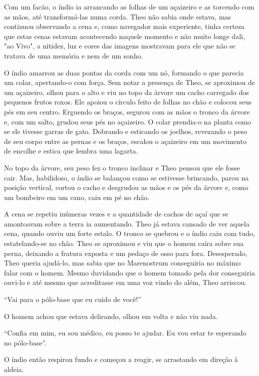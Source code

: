 Com um facão, o índio ia arrancando as folhas de um açaizeiro e as
torcendo com as mãos, até transformá-las numa corda. Theo não sabia onde
estava, mas continuou observando a cena e, como navegador mais
experiente, tinha certeza que estas cenas estavam acontecendo naquele
momento e não muito longe dali, "ao Vivo", a nitidez, luz e cores das
imagens mostravam para ele que não se tratava de uma memória e nem de um
sonho.

O índio amarrou as duas pontas da corda com um nó, formando o que
parecia um colar, apertando-o com força. Sem notar a presença de Theo,
se aproximou de um açaizeiro, olhou para o alto e viu no topo da árvore
um cacho carregado dos pequenos frutos roxos. Ele apoiou o círculo feito
de folhas no chão e colocou seus pés em seu centro. Erguendo os braços,
segurou com as mãos o tronco da árvore e, com um salto, grudou seus pés
no açaizeiro. O colar prendia-o na planta como se ele tivesse garras de
gato. Dobrando e esticando os joelhos, revezando o peso de seu corpo
entre as pernas e os braços, escalou o açaizeiro em um movimento de
encolhe e estica que lembra uma lagarta.

No topo da árvore, seu peso fez o tronco inclinar e Theo pensou que ele
fosse cair. Mas, habilidoso, o índio se balançou como se estivesse
brincando, parou na posição vertical, cortou o cacho e desgrudou as mãos
e os pés da árvore e, como um bombeiro em um cano, caiu em pé no chão.

A cena se repetiu inúmeras vezes e a quantidade de cachos de açaí que se
amontoavam sobre a terra ia aumentando. Theo já estava cansado de ver
aquela cena, quando ouviu um forte estalo. O tronco se quebrou e o índio
caiu com tudo, estatelando-se no chão. Theo se aproximou e viu que o
homem caíra sobre sua perna, deixando a fratura exposta e um pedaço de
osso para fora. Desesperado, Theo queria ajudá-lo, mas sabia que no
Marenostrum conseguiria no máximo falar com o homem. Mesmo duvidando que
o homem tomado pela dor conseguiria ouvi-lo e até mesmo que acreditasse
em uma voz vindo do além, Theo arriscou.

``Vai para o pólo-base que eu cuido de você!''

O homem achou que estava delirando, olhou em volta e não viu nada.

``Confia em mim, eu sou médico, eu posso te ajudar. Eu vou estar te
esperando no pólo-base''.

O índio então respirou fundo e começou a reagir, se arrastando em
direção à aldeia.


